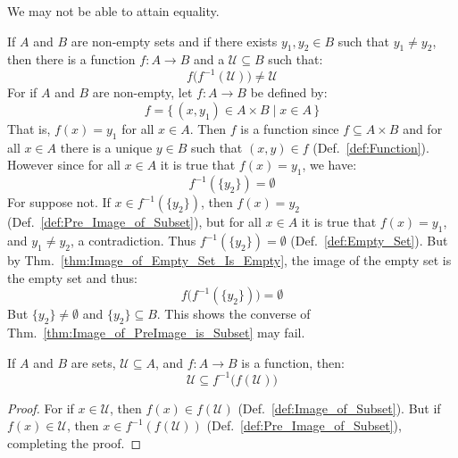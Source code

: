     We may not be able to attain equality.
    \begin{example}
        If $A$ and $B$ are non-empty sets and if there exists
        $y_{1},y_{2}\in{B}$ such that $y_{1}\ne{y}_{2}$, then
        there is a function $f:A\rightarrow{B}$ and a
        $\mathcal{U}\subseteq{B}$ such that:
        \begin{equation}
            f\big(f^{-1}(\mathcal{U})\big)\ne\mathcal{U}
        \end{equation}
        For if $A$ and $B$ are non-empty, let $f:A\rightarrow{B}$ be defined by:
        \begin{equation}
            f=\{\,(x,y_{1})\in{A}\times{B}\;|\;x\in{A}\,\}
        \end{equation}
        That is, $f(x)=y_{1}$ for all $x\in{A}$. Then $f$ is a function since
        $f\subseteq{A}\times{B}$ and for all $x\in{A}$ there is a unique
        $y\in{B}$ such that $(x,y)\in{f}$ (Def.~\ref{def:Function}). However
        since for all $x\in{A}$ it is true that $f(x)=y_{1}$, we have:
        \begin{equation}
            f^{\minus{1}}(\{y_{2}\})=\emptyset
        \end{equation}
        For suppose not. If $x\in{f}^{-1}(\{y_{2}\})$, then $f(x)=y_{2}$
        (Def.~\ref{def:Pre_Image_of_Subset}), but for all $x\in{A}$ it is
        true that $f(x)=y_{1}$, and $y_{1}\ne{y}_{2}$, a contradiction. Thus
        $f^{\minus{1}}(\{y_{2}\})=\emptyset$ (Def.~\ref{def:Empty_Set}). But by
        Thm.~\ref{thm:Image_of_Empty_Set_Is_Empty}, the image of the
        empty set is the empty set and thus:
        \begin{equation}
            f\big(f^{-1}(\{y_{2}\})\big)=\emptyset
        \end{equation}
        But $\{y_{2}\}\ne\emptyset$ and $\{y_{2}\}\subseteq{B}$. This shows
        the converse of Thm.~\ref{thm:Image_of_PreImage_is_Subset} may fail.
    \end{example}
    \begin{theorem}
        \label{thm:PreImage_of_Image_is_Superset}%
        If $A$ and $B$ are sets, $\mathcal{U}\subseteq{A}$, and
        $f:A\rightarrow{B}$ is a function, then:
        \begin{equation*}
            \mathcal{U}\subseteq{f}^{\minus{1}}\big(f(\mathcal{U})\big)
        \end{equation*}
    \end{theorem}
    \begin{proof}
        For if $x\in\mathcal{U}$, then $f(x)\in{f}(\mathcal{U})$
        (Def.~\ref{def:Image_of_Subset}). But if $f(x)\in\mathcal{U}$, then
        $x\in{f}^{\minus{1}}(f(\mathcal{U}))$
        (Def.~\ref{def:Pre_Image_of_Subset}), completing the proof.
    \end{proof}

